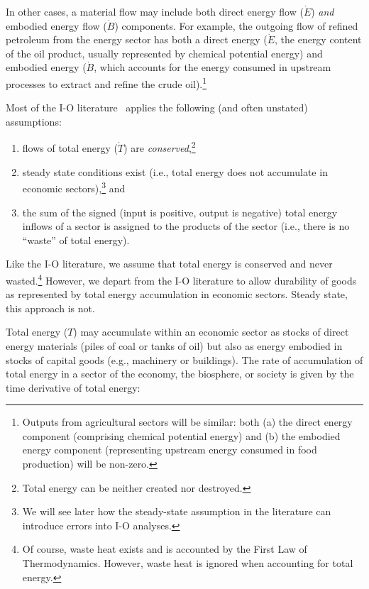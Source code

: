 In other cases, a material flow may include both direct energy flow
($\dot{E}$) \emph{and} embodied energy flow ($\dot{B}$) components.
For example, the outgoing flow of refined petroleum from the energy sector 
has both a direct energy ($\dot{E}$, the energy content of the oil product, 
usually represented by chemical potential energy) 
and embodied energy ($\dot{B}$, which accounts for the energy 
consumed in upstream processes 
to extract and refine the crude oil).\footnote{Outputs from 
agricultural sectors will be similar: 
both (a) the direct energy component (comprising chemical potential energy) 
and (b) the embodied energy component (representing upstream
energy consumed in food production) will be non-zero.}

Most of the I-O literature~\cite{Bullard1975, Herendeen1978} 
applies the following (and often unstated) assumptions:

\begin{enumerate}
	\item flows of total energy ($\dot{T}$) are 
	\emph{conserved},\footnote{Total energy 
	can be neither created nor destroyed.}

	\item steady state conditions exist 
	(i.e., total energy does not accumulate in economic 
	sectors),\footnote{We will see later how the
	steady-state assumption in the literature 
	can introduce errors into I-O analyses.} and
	
	\item the sum of the signed 
	(input is positive, output is negative) 
	total energy inflows of a sector
	is assigned to the products of the sector (i.e., 
	there is no ``waste'' of total energy).
\end{enumerate}

Like the I-O literature, we assume that total energy is conserved
and never wasted.\footnote{Of course, waste heat exists and is
accounted by the First Law of Thermodynamics. However,
waste heat is ignored when accounting for total energy.}
However, we depart from the I-O literature to allow durability of goods 
as represented by total energy accumulation in economic sectors. 
Steady state, this approach is not. 

Total energy ($T$) may accumulate within an economic sector 
as stocks of direct energy materials 
(piles of coal or tanks of oil) 
but also as energy embodied in stocks of capital goods 
(e.g., machinery or buildings). 
The rate of accumulation of total energy 
in a sector of the economy, the biosphere, 
or society is given by the time derivative of total energy:

